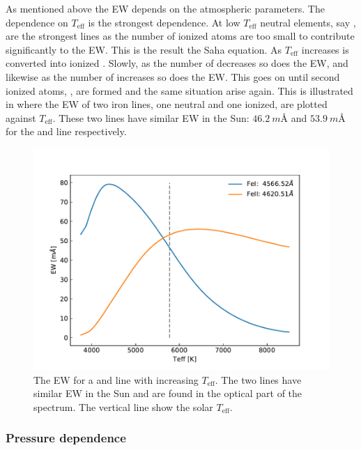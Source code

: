 As mentioned above the EW depends on the atmospheric parameters. The dependence
on $T_\mathrm{eff}$ is the strongest dependence. At low $T_\mathrm{eff}$ neutral
elements, say , are the strongest lines as the number of ionized
atoms are too small to contribute significantly to the EW. This is the result
the Saha equation. As $T_\mathrm{eff}$ increases  is converted into
ionized . Slowly, as the number of  decreases so does the
EW, and likewise as the number of  increases so does the EW. This
goes on until second ionized atoms, , are formed and the same
situation arise again. This is illustrated in  where the EW of
two iron lines, one neutral and one ionized, are plotted against
$T_\mathrm{eff}$. These two lines have similar EW in the Sun:
$\SI{46.2}{m}$\AA{} and $\SI{53.9}{m}$\AA{} for the  and 
line respectively.

\begin{figure}[htpb!]
    \centering
    \includegraphics[width=1.0\linewidth]{figures/ewTeff.pdf}
    \caption{The EW for a  and  line with increasing
             $T_\mathrm{eff}$. The two lines have similar EW in the Sun and are
             found in the optical part of the spectrum. The vertical line show
             the solar $T_\mathrm{eff}$.}
    \label{fig:ewTeff}
\end{figure}


\subsubsection{Pressure dependence}

